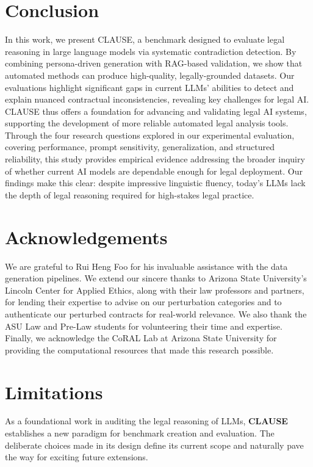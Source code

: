 \documentclass[11pt]{article}
\newcommand{\datasetName}{{\sc CLAUSE}\xspace}
\begin{document}
\section{Conclusion}
\vspace{-0.5em}
In this work, we present \datasetName, a benchmark designed to evaluate legal reasoning in large language models via systematic contradiction detection. By combining persona-driven generation with RAG-based validation, we show that automated methods can produce high-quality, legally-grounded datasets. Our evaluations highlight significant gaps in current LLMs’ abilities to detect and explain nuanced contractual inconsistencies, revealing key challenges for legal AI. \datasetName thus offers a foundation for advancing and validating legal AI systems, supporting the development of more reliable automated legal analysis tools. Through the four research questions explored in our experimental evaluation, covering performance, prompt sensitivity, generalization, and structured reliability, this study provides empirical evidence addressing the broader inquiry of whether current AI models are dependable enough for legal deployment. Our findings make this clear: despite impressive linguistic fluency, today’s LLMs lack the depth of legal reasoning required for high-stakes legal practice.

\section*{Acknowledgements}
We are grateful to Rui Heng Foo for his invaluable assistance with the data generation pipelines. We extend our sincere thanks to Arizona State University's Lincoln Center for Applied Ethics, along with their law professors and partners, for lending their expertise to advise on our perturbation categories and to authenticate our perturbed contracts for real-world relevance. We also thank the ASU Law and Pre-Law students for volunteering their time and expertise. Finally, we acknowledge the CoRAL Lab at Arizona State University for providing the computational resources that made this research possible.

\section*{Limitations}
As a foundational work in auditing the legal reasoning of LLMs, \textbf{CLAUSE} establishes a new paradigm for benchmark creation and evaluation. The deliberate choices made in its design define its current scope and naturally pave the way for exciting future extensions.
\end{document}
